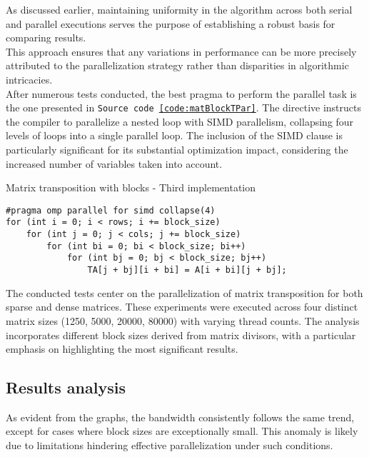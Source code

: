 \documentclass{article}
\begin{document}
As discussed earlier, maintaining uniformity in the algorithm across both serial and parallel executions serves the purpose of establishing a robust basis for comparing results.\\
This approach ensures that any variations in performance can be more precisely attributed to the parallelization strategy rather than disparities in algorithmic intricacies.\\
After numerous tests conducted, the best pragma to perform the parallel task is the one presented in \texttt{Source code~\ref{code:matBlockTPar}}.
The directive instructs the compiler to parallelize a nested loop with SIMD parallelism, collapsing four levels of loops into a single parallel loop.
The inclusion of the SIMD clause is particularly significant for its substantial optimization impact, considering the increased number of variables taken into account.\\

\begin{code}
    \caption{\label{code:matBlockTPar}Matrix transposition with blocks - Third implementation}
    \begin{verbatim}
#pragma omp parallel for simd collapse(4)
for (int i = 0; i < rows; i += block_size) 
    for (int j = 0; j < cols; j += block_size) 
        for (int bi = 0; bi < block_size; bi++) 
            for (int bj = 0; bj < block_size; bj++) 
                TA[j + bj][i + bi] = A[i + bi][j + bj];
    \end{verbatim}
\end{code}

The conducted tests center on the parallelization of matrix transposition for both sparse and dense matrices. These experiments were executed across four distinct matrix sizes (1250, 5000, 20000, 80000) with varying thread counts. The analysis incorporates different block sizes derived from matrix divisors, with a particular emphasis on highlighting the most significant results.

\subsection*{Results analysis}

As evident from the graphs, the bandwidth consistently follows the same trend, except for cases where block sizes are exceptionally small. This anomaly is likely due to limitations hindering effective parallelization under such conditions.
\end{document}
